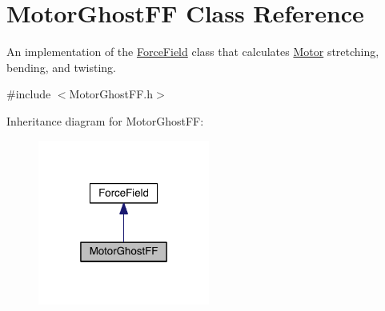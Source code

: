 \hypertarget{classMotorGhostFF}{\section{Motor\+Ghost\+F\+F Class Reference}
\label{classMotorGhostFF}
}


An implementation of the \hyperlink{classForceField}{Force\+Field} class that calculates \hyperlink{classMotorGhost}{Motor} stretching, bending, and twisting.  




{\ttfamily \#include $<$Motor\+Ghost\+F\+F.\+h$>$}



Inheritance diagram for Motor\+Ghost\+F\+F\+:\nopagebreak
\begin{figure}[H]
\begin{center}
\leavevmode
\includegraphics[width=160pt]{classMotorGhostFF__inherit__graph}
\end{center}
\end{figure}


